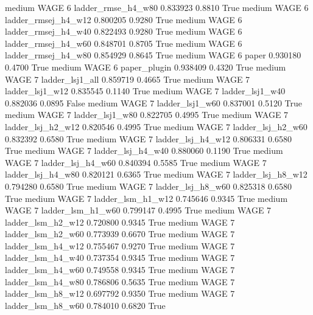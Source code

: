     medium     WAGE                 6  ladder_rmse_h4_w80   0.833923      0.8810    True
    medium     WAGE                 6 ladder_rmsej_h4_w12   0.800205      0.9280    True
    medium     WAGE                 6 ladder_rmsej_h4_w40   0.822493      0.9280    True
    medium     WAGE                 6 ladder_rmsej_h4_w60   0.848701      0.8705    True
    medium     WAGE                 6 ladder_rmsej_h4_w80   0.854929      0.8645    True
    medium     WAGE                 6               paper   0.930180      0.4700    True
    medium     WAGE                 6        paper_plugin   0.938409      0.4320    True
    medium     WAGE                 7     ladder_lsj1_all   0.859719      0.4665    True
    medium     WAGE                 7     ladder_lsj1_w12   0.835545      0.1140    True
    medium     WAGE                 7     ladder_lsj1_w40   0.882036      0.0895   False
    medium     WAGE                 7     ladder_lsj1_w60   0.837001      0.5120    True
    medium     WAGE                 7     ladder_lsj1_w80   0.822705      0.4995    True
    medium     WAGE                 7   ladder_lsj_h2_w12   0.820546      0.4995    True
    medium     WAGE                 7   ladder_lsj_h2_w60   0.832392      0.6580    True
    medium     WAGE                 7   ladder_lsj_h4_w12   0.806331      0.6580    True
    medium     WAGE                 7   ladder_lsj_h4_w40   0.880060      0.1190    True
    medium     WAGE                 7   ladder_lsj_h4_w60   0.840394      0.5585    True
    medium     WAGE                 7   ladder_lsj_h4_w80   0.820121      0.6365    True
    medium     WAGE                 7   ladder_lsj_h8_w12   0.794280      0.6580    True
    medium     WAGE                 7   ladder_lsj_h8_w60   0.825318      0.6580    True
    medium     WAGE                 7   ladder_lsm_h1_w12   0.745646      0.9345    True
    medium     WAGE                 7   ladder_lsm_h1_w60   0.799147      0.4995    True
    medium     WAGE                 7   ladder_lsm_h2_w12   0.720800      0.9345    True
    medium     WAGE                 7   ladder_lsm_h2_w60   0.773939      0.6670    True
    medium     WAGE                 7   ladder_lsm_h4_w12   0.755467      0.9270    True
    medium     WAGE                 7   ladder_lsm_h4_w40   0.737354      0.9345    True
    medium     WAGE                 7   ladder_lsm_h4_w60   0.749558      0.9345    True
    medium     WAGE                 7   ladder_lsm_h4_w80   0.786806      0.5635    True
    medium     WAGE                 7   ladder_lsm_h8_w12   0.697792      0.9350    True
    medium     WAGE                 7   ladder_lsm_h8_w60   0.784010      0.6820    True
